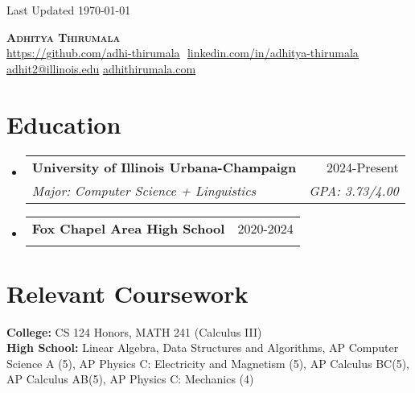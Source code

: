 \documentclass{article}
\makeatletter
\newcommand{\resumeSubheading}[4]{
  \vspace{-2pt}\item
    \begin{tabular*}{0.97\textwidth}[t]{l@{\extracolsep{\fill}}r}
      \textbf{#1} & #2 \\
      \textit{\small#3} & \textit{\small #4} \\
    \end{tabular*}\vspace{-7pt}
}
\newcommand{\resumeSubHeadingListStart}{\begin{itemize}[leftmargin=0.15in, label={}]}
\newcommand{\resumeSubHeadingListEnd}{\end{itemize}}
\makeatother
\begin{document}
\begin{flushright}
	\vspace{-4pt}
	\color{gray}
	\item
	Last Updated \today
\end{flushright}

\vspace{-7pt}

\begin{center}
	\textbf{{\Huge\scshape Adhitya Thirumala}} \\ \vspace{8pt}
	\small
	\href{https://github.com/adhi-thirumala}{\underline{https://github.com/adhi-thirumala}} $  $
	\href{www.linkedin.com/in/adhitya-thirumala}
	{\underline{linkedin.com/in/adhitya-thirumala}} $  $
	\href{mailto:adhit2@illinois.edu}
	{\underline{adhit2@illinois.edu}}
	\href{https://www.adhithirumala.com}
	{\underline{adhithirumala.com}} $  $


\end{center}

\section{Education}
\resumeSubHeadingListStart

\resumeSubheading{University of Illinois Urbana-Champaign} {2024-Present} {Major: Computer Science + Linguistics}{GPA: 3.73/4.00}
\resumeSubheading
{Fox Chapel Area High School}{2020-2024}
{}{}
\resumeSubHeadingListEnd
\vspace{-15pt}
\section{Relevant Coursework}
\begin{itemize}[leftmargin=0.15in, label={}]
	\small{\item{
		           \textbf{College: }{CS 124 Honors, MATH 241 (Calculus III)}\\
		            \textbf{High School:}{ Linear Algebra, Data Structures and Algorithms, AP Computer Science A (5), AP Physics C: Electricity and Magnetism (5), AP Calculus BC(5), AP Calculus AB(5), AP Physics C: Mechanics (4)} \\

		      }}
\end{itemize}
\end{document}
